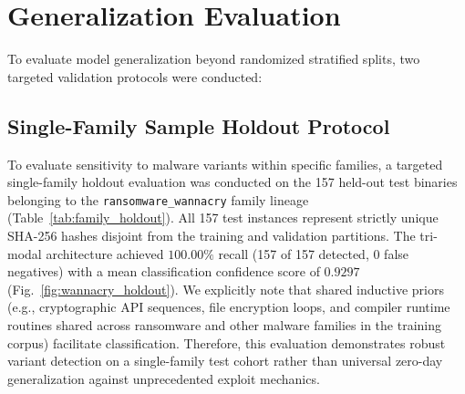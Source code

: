 \documentclass[pdflatex,sn-mathphys-num]{sn-jnl}
\begin{document}
\begin{tableorg}[t]
\centering
\caption{Controlled ablation analysis evaluating marginal contributions of modalities and objectives.}\label{tab:ablation_results}
\end{tableorg}

\section{Generalization Evaluation}\label{sec:generalization}
To evaluate model generalization beyond randomized stratified splits, two targeted validation protocols were conducted:

\subsection{Single-Family Sample Holdout Protocol}\label{sec:gen_family}
To evaluate sensitivity to malware variants within specific families, a targeted single-family holdout evaluation was conducted on the 157 held-out test binaries belonging to the \texttt{ransomware\_wannacry} family lineage (Table~\ref{tab:family_holdout}). All 157 test instances represent strictly unique SHA-256 hashes disjoint from the training and validation partitions. The tri-modal architecture achieved $100.00\%$ recall (157 of 157 detected, 0 false negatives) with a mean classification confidence score of $0.9297$ (Fig.~\ref{fig:wannacry_holdout}). We explicitly note that shared inductive priors (e.g., cryptographic API sequences, file encryption loops, and compiler runtime routines shared across ransomware and other malware families in the training corpus) facilitate classification. Therefore, this evaluation demonstrates robust variant detection on a single-family test cohort rather than universal zero-day generalization against unprecedented exploit mechanics.
\end{document}
